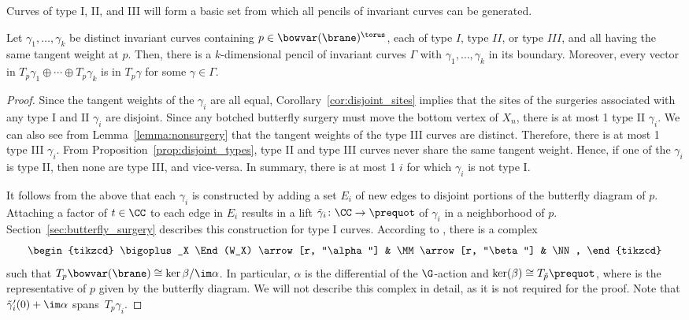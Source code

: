 Curves of type I, II, and III will form a basic set from which all pencils of invariant curves can be generated.

\begin{Proposition} \label{prop:pencil_generation}
Let $\gamma_1, \dots , \gamma_k$ be distinct invariant curves containing $p\in\bowvar(\brane)^\torus$, each of type $I$, type $II$, or type $III$, and all having the same tangent weight at $p$. Then, there is a $k$-dimensional pencil of invariant curves $\Gamma$ with $\gamma_1, \dots , \gamma_k$ in its boundary. Moreover, every vector in $T_p\gamma_1 \oplus\cdots\oplus T_p\gamma_k$ is in $T_p\gamma$ for some $\gamma\in\Gamma$.
\end{Proposition}

\begin{proof}
Since the tangent weights of the $\gamma_i$ are all equal, Corollary~\ref{cor:disjoint_sites} implies that the sites of the surgeries associated with any type I and II $\gamma_i$ are disjoint. Since any botched butterfly surgery must move the bottom vertex of $X_n$, there is at most 1 type II $\gamma_i$.
We can also see from Lemma~\ref{lemma:nonsurgery} that the tangent weights of the type III curves are distinct. Therefore, there is at most 1 type III $\gamma_i$.
From Proposition~\ref{prop:disjoint_types}, type II and type III curves never share the same tangent weight. Hence, if one of the $\gamma_i$ is type II, then none are type III, and vice-versa. In summary, there is at most 1 $i$ for which $\gamma_i$ is not type I.

It follows from the above that each $\gamma_i$ is constructed by adding a set $E_i$ of new edges to disjoint portions of the butterfly diagram of $p$. Attaching a factor of $t \in \CC$ to each edge in $E_i$ results in a lift $\tilde{\gamma}_i\colon\CC \to \prequot$ of $\gamma_i$ in a neighborhood of $p$. Section~\ref{sec:butterfly_surgery} describes this construction for type I curves. According to \cite[Section~2.5]{NT}, there is a complex
\[
\begin{tikzcd}
\bigoplus_X \End(W_X) \arrow[r, "\alpha"] & \MM \arrow[r, "\beta"] & \NN,
\end{tikzcd}
\]
such that $T_p\bowvar(\brane) \cong \ker\beta/\im\alpha$. In particular, $\alpha$ is the differential of the $\G$-action and $\ker(\beta) \cong \smash{T_{\tilde{p}}\prequot}$, where  is the representative of $p$ given by the butterfly diagram. We will not describe this complex in detail, as it is not required for the proof. Note that $\tilde{\gamma}_i'(0) + \im\alpha$ spans~$T_p\gamma_i$.


\end{proof}
